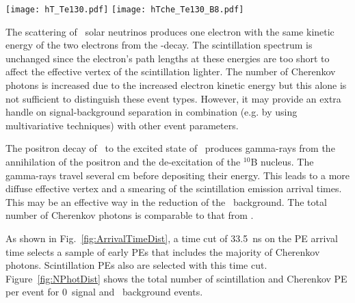 \begin{figure*}[ht]
  \centering
  \texttt{[image: hT\_Te130.pdf]}
  \texttt{[image: hTche\_Te130\_B8.pdf]}
  \caption{\emph{Left:} Photo-electron (PE) arrival times after
    application of the photo-detector transit time spread (TTS) of
    100~ps for the simulation of 1000 0{\nbb} decay events of
    $^{130}$Te at the center of the detector. PEs from Cherenkov light
    (\emph{dashed red line}) and scintillation light (\emph{solid blue
      line}) are compared. The black vertical line illustrates a time
    cut at 33.5 ns. \emph{Right:} Comparison between Cherenkov PEs
    arrival time for $^{130}$Te {0\nbb} decay (\emph{solid line}) and
    $^{8}$B (\emph{dotted line}) events. {\bf Distributions of the
      scintillation PEs arrival time are indistinguishable between
      $^{130}$Te 0{\nbb} decay and $^8$B due to identical total energy
      in the event, $Q(^{130}{\rm Te})=2.526$~MeV.} }
\label{fig:ArrivalTimeDist}
\end{figure*}

The scattering of \B~solar neutrinos produces one electron with the same kinetic energy of the two electrons from the \bb-decay. The scintillation spectrum is unchanged since the electron's path lengths at these energies are too short to affect the effective vertex of the scintillation lighter. The number of Cherenkov photons is increased due to the increased electron kinetic energy but this alone is not sufficient to distinguish these event types. However, it may provide an extra handle on signal-background separation in combination (e.g. by using multivariative techniques) with other event parameters.

The positron decay of \C~to the excited state of \B~produces gamma-rays from the annihilation of the positron and the de-excitation of the $^{10}$B nucleus. The gamma-rays travel several cm before depositing their energy. This leads to a more diffuse effective vertex and a smearing of the scintillation emission arrival times. This may be an effective way in the reduction of the \C~background. The total number of Cherenkov photons is comparable to that from \nbb.

As shown in Fig.~\ref{fig:ArrivalTimeDist}, a time cut of 33.5~ns on the PE arrival time selects a sample of early PEs that includes the majority of Cherenkov photons. Scintillation PEs also are selected with this time cut. Figure~\ref{fig:NPhotDist} shows the total number of scintillation and Cherenkov PE per event for 0\nbb~signal and \B~background events. 

